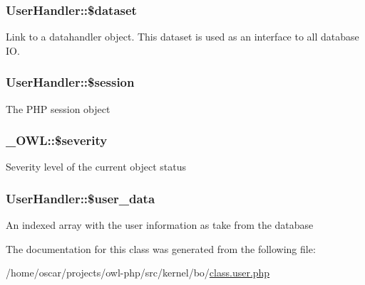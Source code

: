 \subsubsection[{\$dataset}]{\setlength{\rightskip}{0pt plus 5cm}UserHandler::\$dataset}\label{classUserHandler_ac38c1ea50b2820ed03781bdbe8eb2e08}
Link to a datahandler object. This dataset is used as an interface to all database IO. 
\subsubsection[{\$session}]{\setlength{\rightskip}{0pt plus 5cm}UserHandler::\$session}\label{classUserHandler_af097b7fd1ee085b46a6c34e071508a7f}
The PHP session object 
\subsubsection[{\$severity}]{\setlength{\rightskip}{0pt plus 5cm}\_\-OWL::\$severity}\label{class__OWL_ad26b40a9dbbacb33e299b17826f8327c}
Severity level of the current object status 
\subsubsection[{\$user\_\-data}]{\setlength{\rightskip}{0pt plus 5cm}UserHandler::\$user\_\-data}\label{classUserHandler_ae7a2d59eee65560ac96b860e828bb445}
An indexed array with the user information as take from the database 

The documentation for this class was generated from the following file:\begin{DoxyCompactItemize}
\item 
/home/oscar/projects/owl-\/php/src/kernel/bo/\hyperlink{class_8user_8php}{class.user.php}\end{DoxyCompactItemize}
